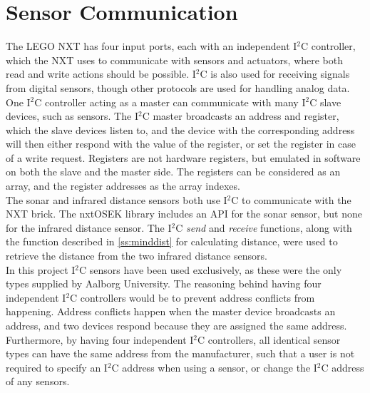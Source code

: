 \section{Sensor Communication}
The LEGO NXT has four input ports, each with an independent I$^2$C controller, which the NXT uses to communicate with sensors and actuators, where both read and write actions should be possible. I$^2$C is also used for receiving signals from digital sensors, though other protocols are used for handling analog data. One I$^2$C controller acting as a master can communicate with many I$^2$C slave devices, such as sensors. The I$^2$C master broadcasts an address and register, which the slave devices listen to, and the device with the corresponding address will then either respond with the value of the register, or set the register in case of a write request. Registers are not hardware registers, but emulated in software on both the slave and the master side. The registers can be considered as an array, and the register addresses as the array indexes. 
\\

The sonar and infrared distance sensors both use I$^2$C to communicate with the NXT brick. The nxtOSEK library includes an API for the sonar sensor, but none for the infrared distance sensor. The I$^2$C \emph{send} and \emph{receive} functions, along with the function described in \cref{ss:minddist} for calculating distance, were used to retrieve the distance from the two infrared distance sensors.\\

In this project I$^2$C sensors have been used exclusively, as these were the only types supplied by Aalborg University. The reasoning behind having four independent I$^2$C controllers would be to prevent address conflicts from happening. Address conflicts happen when the master device broadcasts an address, and two devices respond because they are assigned the same address. Furthermore, by having four independent I$^2$C controllers, all identical sensor types can have the same address from the manufacturer, such that a user is not required to specify an I$^2$C address when using a sensor, or change the I$^2$C address of any sensors. \\


